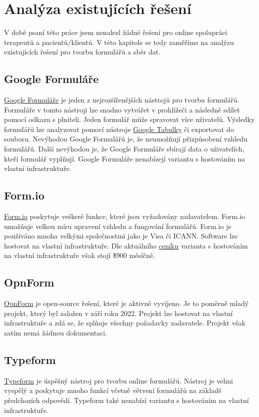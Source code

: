 \chapter{Analýza existujících řešení}\label{ch:analyza-existujicich-reseni-pro-praci-s-formulari}

V době psaní této práce jsem nenalezl žádné řešení pro online spolupráci terapeutů a pacientů/klientů.
V této kapitole se tedy zaměříme na analýzu existujících řešení pro tvorbu formulářů a sběr dat.

\section*{Google Formuláře}\label{sec:google-formulare}

\href{https://www.google.com/forms/about/}{Google Formuláře} je jeden z nejrozšířenějších nástrojů pro tvorbu formulářů.
Formuláře v tomto nástroji lze snadno vytvářet v prohlížeči a následně sdílet pomocí odkazu s plniteli.
Jeden formulář může spravovat více uživatelů.
Výsledky formulářů lze analyzovat pomocí nástroje \href{https://www.google.com/intl/cs/sheets/about/}{Google Tabulky} či exportovat do souboru.
Nevýhodou Google Formulářů je, že neumožňují přizpůsobení vzhledu formulářů.
Další nevýhodou je, že Google Formuláře sbírají data o uživatelích, kteří formulář vyplňují.
Google Formuláře nenabízejí variantu s hostováním na vlastní infrastruktuře.

\section*{Form.io}\label{sec:formio}

\href{https://form.io/}{Form.io} poskytuje veškeré funkce, které jsou vyžadovány zadavatelem.
Form.io umožňuje velkou míru upravení vzhledu a fungování formulářů.
Form.io je používáno mnoha velkými společnostmi jako je Visa či ICANN\@.
Software lze hostovat na vlastní infrastruktuře.
Dle aktuálního \href{https://form.io/pricing}{ceníku} varianta s hostováním na vlastní infrastruktuře však stojí \$900 měsíčně.

\section*{OpnForm}\label{sec:opnform}

\href{https://opnform.com/}{OpnForm} je open-source řešení, které je aktivně vyvíjeno.
Je to poměrně mladý projekt, který byl založen v září roku 2022.
Projekt lze hostovat na vlastní infrastruktuře a zdá se, že splňuje všechny požadavky zadavatele.
Projekt však zatím nemá žádnou dokumentaci.

\section*{Typeform}\label{sec:typeform}

\href{https://www.typeform.com/}{Typeform} je úspěšný nástroj pro tvorbu online formulářů.
Nástroj je velmi vyspělý a poskytuje mnoho funkcí včetně větvení formulářů na základě předchozích odpovědí.
Typeform také nenabízí variantu s hostováním na vlastní infrastruktuře.
